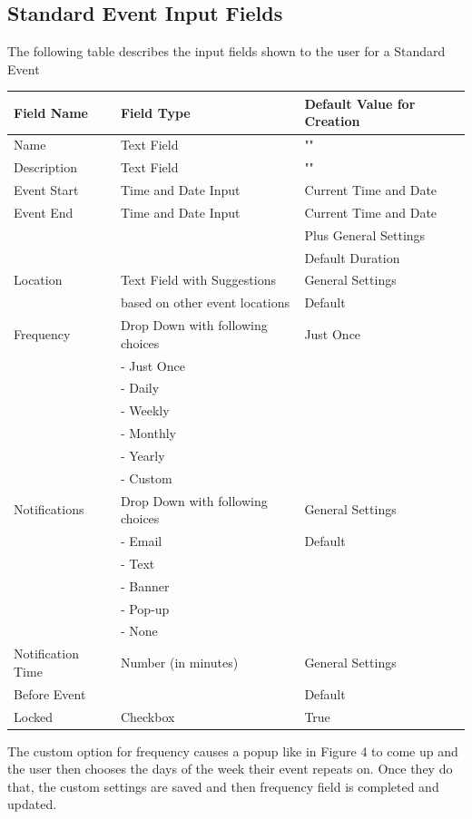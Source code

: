 \documentclass{scrreprt}
\begin{document}
\subsection{Standard Event Input Fields}
The following table describes the input fields shown to the user for a Standard Event
\begin{center}
\begin{longtable}{ | p{3cm} | p{8cm} | p{4cm} | }
\hline
\textbf{Field Name} & \textbf{Field Type} & \textbf{Default Value for Creation} \\
\hline
Name & Text Field & "" \\
\hline
Description & Text Field & "" \\
\hline
Event Start & Time and Date Input & Current Time and Date \\
\hline
Event End & Time and Date Input & Current Time and Date \\
& & Plus General Settings \\
& & Default Duration \\
\hline
Location & Text Field with Suggestions & General Settings \\
& based on other event locations & Default \\
\hline
Frequency & Drop Down with following choices & Just Once \\
& - Just Once & \\
& - Daily & \\
& - Weekly & \\
& - Monthly & \\
& - Yearly & \\
& - Custom & \\
\hline
Notifications & Drop Down with following choices & General Settings\\
& - Email & Default\\
& - Text & \\
& - Banner & \\
& - Pop-up & \\
& - None & \\
\hline
Notification Time & Number (in minutes) & General Settings \\
Before Event & & Default \\
\hline
Locked & Checkbox & True \\
\hline
\end{longtable}
\end{center}

The custom option for frequency causes a popup like in Figure 4 to come up and the user then chooses the days of the week their event repeats on.  Once they do that, the custom settings are saved and then frequency field is completed and updated.
\end{document}
